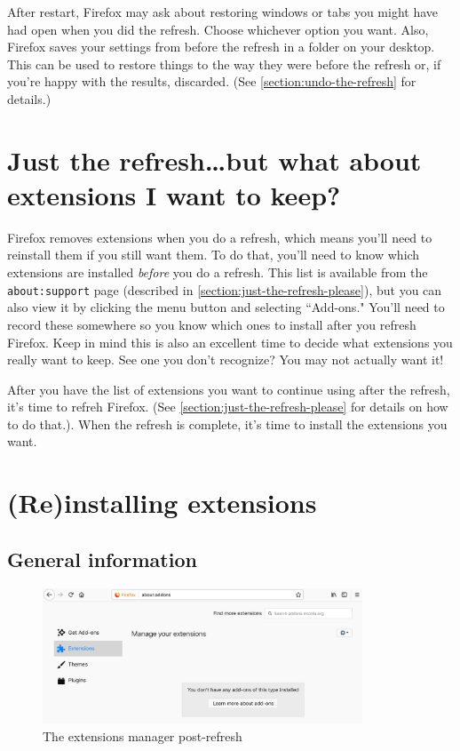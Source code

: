 \documentclass[fontsize=11pt]{article}
\begin{document}
After restart, Firefox may ask about restoring windows or tabs you might have had open when you did the refresh.  Choose whichever option you want.  Also, Firefox saves your settings from before the refresh in a folder on your desktop.  This can be used to restore things to the way they were before the refresh or, if you're happy with the results, discarded.  (See \cref{section:undo-the-refresh} for details.)




\section{Just the refresh\ldots{}but what about extensions I want to keep?}
Firefox removes extensions when you do a refresh, which means you'll need to reinstall them if you still want them.  To do that, you'll need to know which extensions are installed \emph{before} you do a refresh.  This list is available from the \texttt{about:support} page (described in \cref{section:just-the-refresh-please}), but you can also view it by clicking the menu button and selecting ``Add-ons."  You'll need to record these somewhere so you know which ones to install after you refresh Firefox.  Keep in mind this is also an excellent time to decide what extensions you really want to keep.  See one you don't recognize?  You may not actually want it!

After you have the list of extensions you want to continue using after the refresh, it's time to refreh Firefox.  (See \cref{section:just-the-refresh-please} for details on how to do that.). When the refresh is complete, it's time to install the extensions you want.





\section{(Re)installing extensions}



\subsection{General information}

\begin{figure}[h]
	\centering
	\includegraphics[width=0.85\textwidth]{images/extensions-post-refresh.png}
	\caption{The extensions manager post-refresh }
	\label{fig:extensions-post-refresh}
\end{figure}
\end{document}
